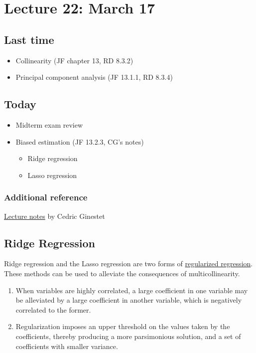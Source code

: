 \setcounter{section}{21}

\section{Lecture 22: March 17}


\subsection*{Last time}
\begin{itemize}
	\item Collinearity (JF chapter 13, RD 8.3.2)
\item Principal component analysis (JF 13.1.1, RD 8.3.4)
\end{itemize}


\subsection*{Today}
\begin{itemize}
	\item Midterm exam review
	\item Biased estimation (JF 13.2.3, CG's notes)
	\begin{itemize}
		\item Ridge regression
		\item Lasso regression
	\end{itemize}
\end{itemize}

\subsubsection*{Additional reference}
\href{https://math.bu.edu/people/cgineste/classes/ma575/p/w14_1.pdf}{Lecture notes} by Cedric Ginestet

\subsection*{Ridge Regression}

Ridge regression and the Lasso regression are two forms of \underline{regularized regression}.
These methods can be used to alleviate the consequences of multicollinearity.

\begin{enumerate}
	\item When variables are highly correlated, a large coefficient in one variable may be alleviated by a large coefficient in another variable, which is negatively correlated to the former.
	\item Regularization imposes an upper threshold on the values taken by the coefficients, thereby producing a more parsimonious solution, and a set of coefficients with smaller variance.
\end{enumerate}

